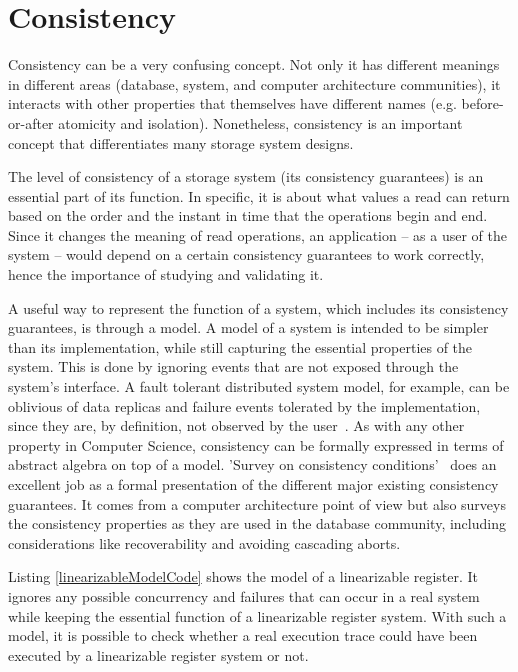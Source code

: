 \documentclass[12pt,conference]{IEEEtran}
\begin{document}
\section{Consistency}

Consistency can be a very confusing concept. Not only it has different meanings in different areas (database, system, and computer architecture communities), it interacts with other properties that themselves have different names (e.g. before-or-after atomicity and isolation). Nonetheless, consistency is an important concept that differentiates many storage system designs. 

The level of consistency of a storage system (its consistency guarantees) is an essential part of its function. In specific, it is about what values a read can return based on the order and the instant in time that the operations begin and end. Since it changes the meaning of read operations, an application -- as a user of the system -- would depend on a certain consistency guarantees to work correctly, hence the importance of studying and validating it.

A useful way to represent the function of a system, which includes its consistency guarantees, is through a model. A model of a system is intended to be simpler than its implementation, while still capturing the essential properties of the system. This is done by ignoring events that are not exposed through the system's interface. A fault tolerant distributed system model, for example, can be oblivious of data replicas and failure events tolerated by the implementation, since they are, by definition, not observed by the user~\cite{avizienis2004basic}. As with any other property in Computer Science, consistency can be formally expressed in terms of abstract algebra on top of a model. 'Survey on consistency conditions'~\cite{dziuma2013survey} does an excellent job as a formal presentation of the different major existing consistency guarantees. It comes from a computer architecture point of view but also surveys the consistency properties as they are used in the database community, including considerations like recoverability and avoiding cascading aborts.

Listing \ref{linearizableModelCode} shows the model of a linearizable register. It ignores any possible concurrency and failures that can occur in a real system while keeping the essential function of a linearizable register system. With such a model, it is possible to check whether a real execution trace could have been executed by a linearizable register system or not.
\end{document}
